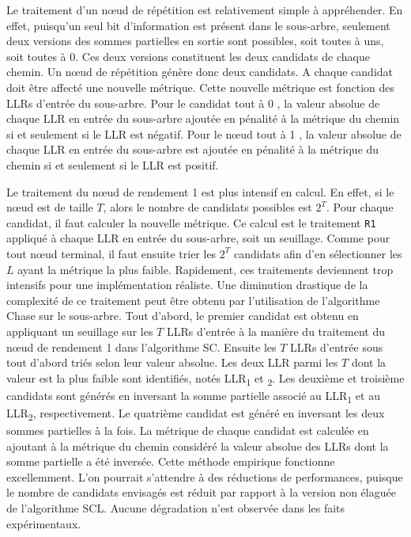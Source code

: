 Le traitement d'un nœud de répétition est relativement simple à appréhender. En effet, puisqu'un seul bit d'information est présent dans le sous-arbre, seulement deux versions des sommes partielles en sortie sont possibles, soit toutes à uns, soit toutes à 0. Ces deux versions constituent les deux candidats de chaque chemin. Un nœud de répétition génère donc deux candidats. A chaque candidat doit être affecté une nouvelle métrique. Cette nouvelle métrique est fonction des LLRs d'entrée du sous-arbre. Pour le candidat \og tout à 0 \fg, la valeur absolue de chaque LLR en entrée du sous-arbre ajoutée en pénalité à la métrique du chemin si et seulement si le LLR est négatif. Pour le nœud \og tout à 1 \fg, la valeur absolue de chaque LLR en entrée du sous-arbre est ajoutée en pénalité à la métrique du chemin si et seulement si le LLR est positif.

Le traitement du nœud de rendement 1 est plus intensif en calcul. En effet, si le nœud est de taille $T$, alors le nombre de candidats possibles est $2^T$. Pour chaque candidat, il faut calculer la nouvelle métrique. Ce calcul est le traitement \texttt{R1} appliqué à chaque LLR en entrée du sous-arbre, soit un seuillage. Comme pour tout nœud terminal, il faut ensuite trier les $2^T$ candidats afin d'en sélectionner les $L$ ayant la métrique la plus faible. Rapidement, ces traitements deviennent trop intensifs pour une implémentation réaliste. Une diminution drastique de la complexité de ce traitement peut être obtenu par l'utilisation de l'algorithme \og Chase \fg sur le sous-arbre. Tout d'abord, le premier candidat est obtenu en appliquant un seuillage sur les $T$ LLRs d'entrée à la manière du traitement du nœud de rendement 1 dans l'algorithme SC. Ensuite les $T$ LLRs d'entrée sous tout d'abord triés selon leur valeur absolue. Les deux LLR parmi les $T$  dont la valeur est la plus faible sont identifiés, notés LLR\textsubscript{1} et \textsubscript{2}. Les deuxième et troisième candidats sont générés en inversant la somme partielle associé au LLR\textsubscript{1} et au LLR\textsubscript{2}, respectivement. Le quatrième candidat est généré en inversant les deux sommes partielles à la fois. La métrique de chaque candidat est calculée en ajoutant à la métrique du chemin considéré la valeur absolue des LLRs dont la somme partielle a été inversée. Cette méthode empirique fonctionne excellemment. L'on pourrait s'attendre à des réductions de performances, puisque le nombre de candidats envisagés est réduit par rapport à la version non élaguée de l'algorithme SCL. Aucune dégradation n'est observée dans les faits expérimentaux.
 

